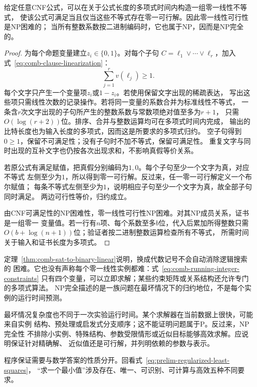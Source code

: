 \begin{theorem}[CNF可满足性归约到零一线性可行性]
\label{thm:comb-sat-to-binary-linear}
给定任意CNF公式，可以在关于公式长度的多项式时间内构造一组零一线性不等式，
使该公式可满足当且仅当这些不等式存在零一可行解。因此零一线性可行性是NP困难的；
当所有整数系数按二进制编码时，它也属于NP，因而是NP完全的。
\end{theorem}

\begin{proof}
为每个命题变量建立$z_i\in\{0,1\}$。对每个子句
$C=\ell_1\lor\cdots\lor\ell_r$，加入式~\eqref{eq:comb-clause-linearization}：
\[
  \sum_{j=1}^{r}v(\ell_j)\geq1.
\]
每个文字只产生一个变量项$z_i$或$1-z_i$。若使用保留文字出现的稀疏表达，
写出这些项只需线性次数的记录操作。若将同一变量的系数合并为标准线性不等式，
一条含$r$次文字出现的子句所产生的整数系数与常数项绝对值至多为$r+1$，
只需$O(\log(r+2))$位。排序、合并与整数运算均可在多项式时间内完成，
输出的比特长度也为输入长度的多项式，因而这是所要求的多项式归约。
空子句得到$0\geq1$，保留不可满足性；没有子句时不加不等式，保留可满足性。
重复文字与同时出现的互补文字也仍按各次出现求和，不影响真假等价关系。

若原公式有满足赋值，把真假分别编码为$1,0$。每个子句至少一个文字为真，对应不等式
左侧至少为$1$，所以得到零一可行解。反过来，任一零一可行解定义一个布尔赋值；
每条不等式左侧至少为$1$，说明相应子句至少一个文字为真，故全部子句同时满足。
两边可行性等价，归约成立。

由CNF可满足性的NP困难性，零一线性可行性NP困难。对其NP成员关系，证书是一组零一
变量值。若一行有$n$项、每个系数至多$b$位，代入后累加所得整数只需
$O(b+\log(n+1))$位；验证者按二进制整数运算检查所有不等式，
所需时间关于输入和证书长度为多项式。
\end{proof}

定理~\ref{thm:comb-sat-to-binary-linear}说明，换成代数记号不会自动消除逻辑搜索的
困难。它也没有声称每个零一线性实例都难：式~\eqref{eq:comb-running-integer-constraints}
只有四个变量，可以立即求解；某些约束矩阵或关系结构还允许专门的多项式算法。
NP完全描述的是一族问题在最坏情况下的归约地位，不是每个实例的运行时间预测。

最坏情况复杂度也不同于一次实验运行时间。某个求解器在当前数据上很快，可能来自实例
结构、预处理或启发式分支顺序；这不能证明问题属于$\mathrm{P}$。反过来，NP完全性
不排除小实例、特殊结构、参数受限情形或近似目标能够高效求解。应说明保证针对精确解、
近似值还是可行解，并列明依赖的参数与表示。

程序保证需要与数学答案的性质分开。回看式~\eqref{eq:prelim-regularized-least-squares}，
“求一个最小值”涉及存在、唯一、可识别、可计算与高效五种不同要求。

